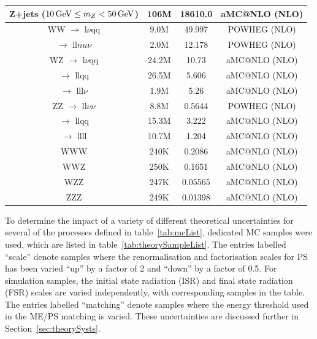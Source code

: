 \begin{table}[htbp]
{\begin{tabular}{cccc}
   Z+jets ($10 \,\text{Ge\hspace{-.08em}V} \leq m_{Z} < 50\,\text{Ge\hspace{-.08em}V}$) & 106M & 18610.0 & aMC@NLO (NLO) \\
   \hline
   WW $\rightarrow$ l$\nu$qq & 9.0M & 49.997  & POWHEG (NLO) \\
      $\rightarrow$ ll$nu\nu$ & 2.0M & 12.178 & POWHEG (NLO) \\
   \hline
   WZ $\rightarrow$ l$\nu$qq & 24.2M & 10.73 & aMC@NLO (NLO) \\
      $\rightarrow$ llqq & 26.5M & 5.606 & aMC@NLO (NLO) \\
      $\rightarrow$ lll$\nu$ & 1.9M & 5.26 & aMC@NLO (NLO) \\
   \hline
   ZZ $\rightarrow$ ll$\nu\nu$ & 8.8M & 0.5644 & POWHEG (NLO) \\
      $\rightarrow$ llqq & 15.3M & 3.222 & aMC@NLO (NLO) \\
      $\rightarrow$ llll & 10.7M & 1.204 & aMC@NLO (NLO) \\
   \hline
   WWW & 240K & 0.2086 & aMC@NLO (NLO) \\
   \hline
   WWZ & 250K & 0.1651 & aMC@NLO (NLO) \\
   \hline
   WZZ & 247K & 0.05565 & aMC@NLO (NLO) \\
   \hline
   ZZZ & 249K & 0.01398 & aMC@NLO (NLO) \\
   \hline
   
 \end{tabular}}
\end{table}

To determine the impact of a variety of different theoretical uncertainties for several of the processes defined in table~\ref{tab:mcList}, dedicated MC samples were used, which are listed in table~\ref{tab:theorySampleList}.
The entries labelled ``scale'' denote samples where the renormalisation and factorisation scales for PS has been varied ``up'' by a factor of 2 and ``down'' by a factor of 0.5.
For \ttbar simulation samples, the initial state radiation (ISR) and final state radiation (FSR) scales are varied independently, with corresponding samples in the table.
The entries labelled ``matching'' denote samples where the energy threshold used in the ME/PS matching is varied.
These uncertainties are discussed further in Section~\ref{sec:theorySysts}.

